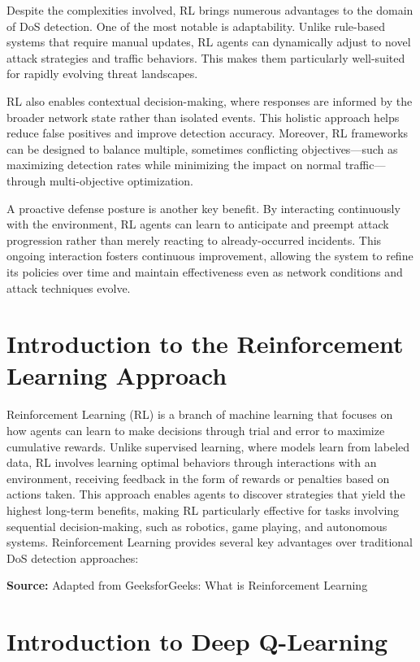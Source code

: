 \documentclass{report}
\begin{document}
Despite the complexities involved, RL brings numerous advantages to the domain of DoS detection. One of the most notable is adaptability. Unlike rule-based systems that require manual updates, RL agents can dynamically adjust to novel attack strategies and traffic behaviors. This makes them particularly well-suited for rapidly evolving threat landscapes.

RL also enables contextual decision-making, where responses are informed by the broader network state rather than isolated events. This holistic approach helps reduce false positives and improve detection accuracy. Moreover, RL frameworks can be designed to balance multiple, sometimes conflicting objectives—such as maximizing detection rates while minimizing the impact on normal traffic—through multi-objective optimization.

A proactive defense posture is another key benefit. By interacting continuously with the environment, RL agents can learn to anticipate and preempt attack progression rather than merely reacting to already-occurred incidents. This ongoing interaction fosters continuous improvement, allowing the system to refine its policies over time and maintain effectiveness even as network conditions and attack techniques evolve.

\section{Introduction to the Reinforcement Learning Approach}

Reinforcement Learning (RL) is a branch of machine learning that focuses on how agents can learn to make decisions through trial and error to maximize cumulative rewards. Unlike supervised learning, where models learn from labeled data, RL involves learning optimal behaviors through interactions with an environment, receiving feedback in the form of rewards or penalties based on actions taken. This approach enables agents to discover strategies that yield the highest long-term benefits, making RL particularly effective for tasks involving sequential decision-making, such as robotics, game playing, and autonomous systems.
Reinforcement Learning provides several key advantages over traditional DoS detection approaches:

\noindent\textbf{Source:} Adapted from GeeksforGeeks: What is Reinforcement Learning
\section{Introduction to Deep Q-Learning}
\end{document}
